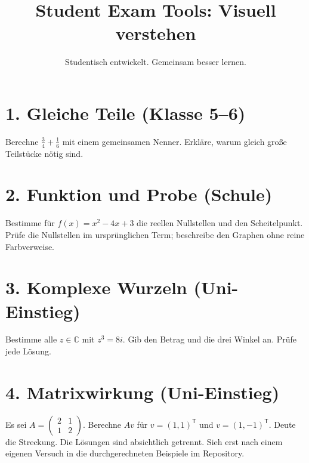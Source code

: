 \documentclass[11pt,a4paper]{article}
\title{Student Exam Tools: Visuell verstehen}
\author{Studentisch entwickelt. Gemeinsam besser lernen.}
\date{}
\begin{document}
\maketitle
\section*{1. Gleiche Teile (Klasse 5--6)}
Berechne $\frac34+\frac16$ mit einem gemeinsamen Nenner. Erkläre, warum gleich große Teilstücke nötig sind.
\section*{2. Funktion und Probe (Schule)}
Bestimme für $f(x)=x^2-4x+3$ die reellen Nullstellen und den Scheitelpunkt. Prüfe die Nullstellen im ursprünglichen Term; beschreibe den Graphen ohne reine Farbverweise.
\section*{3. Komplexe Wurzeln (Uni-Einstieg)}
Bestimme alle $z\in\mathbb C$ mit $z^3=8i$. Gib den Betrag und die drei Winkel an. Prüfe jede Lösung.
\section*{4. Matrixwirkung (Uni-Einstieg)}
Es sei $A=\begin{pmatrix}2&1\\1&2\end{pmatrix}$. Berechne $Av$ für $v=(1,1)^\mathsf T$ und $v=(1,-1)^\mathsf T$. Deute die Streckung.
\bigskip
Die Lösungen sind absichtlich getrennt. Sieh erst nach einem eigenen Versuch in die durchgerechneten Beispiele im Repository.
\end{document}
